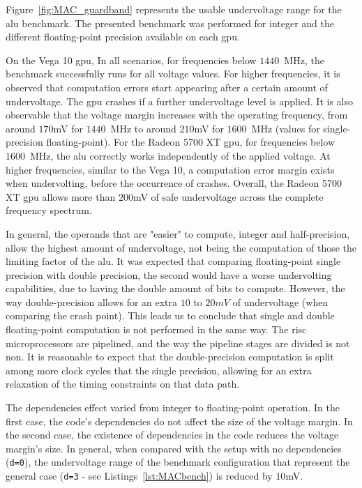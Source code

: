 \label{sec:cmac_guardband}

Figure~\ref{fig:MAC_guardband} represents the usable undervoltage range for the \acrshort{alu} benchmark. The presented benchmark was performed for integer and the different floating-point precision available on each \acrshort{gpu}. 

On the Vega 10 \acrshort{gpu}, In all scenarios, for frequencies below $1440$~MHz, the benchmark successfully runs for all voltage values. For higher frequencies, it is observed that computation errors start appearing after a certain amount of undervoltage. The \acrshort{gpu} crashes if a further undervoltage level is applied. 
It is also observable that the voltage margin increases with the operating frequency, from around $170$mV for $1440$~MHz to around $210$mV for $1600$~MHz (values for single-precision floating-point). For the Radeon 5700 XT \acrshort{gpu}, for frequencies below $1600$~MHz, the \acrshort{alu} correctly works independently of the applied voltage. At higher frequencies, similar to the Vega 10, a computation error margin exists when undervolting, before the occurrence of crashes. Overall, the Radeon 5700 XT \acrshort{gpu} allows more than $200$mV of safe undervoltage across the complete frequency spectrum.

In general, the operands that are "easier" to compute, integer and half-precision, allow the highest amount of undervoltage, not being the computation of those the limiting factor of the \acrshort{alu}. 
It was expected that comparing floating-point single precision with double precision, the second would have a worse undervolting capabilities, due to having the double amount of bits to compute. However, the way double-precision allows for an extra $10$ to $20mV$ of undervoltage (when comparing the crash point). This leads us to conclude that single and double floating-point computation is not performed in the same way. The \acrshort{risc} microprocessors are pipelined, and the way the pipeline stages are divided is not non. It is reasonable to expect that the double-precision computation is split among more clock cycles that the single precision, allowing for an extra relaxation of the timing constraints on that data path.

The dependencies effect varied from integer to floating-point operation. In the first case, the code's dependencies do not affect the size of the voltage margin. In the second case, the existence of dependencies in the code reduces the voltage margin's size. In general, when compared with the setup with no dependencies (\texttt{d=0}), the undervoltage range of the benchmark configuration that represent the general case (\texttt{d=3} - see Listings~\ref{lst:MACbench}) is reduced by $10$mV. 

